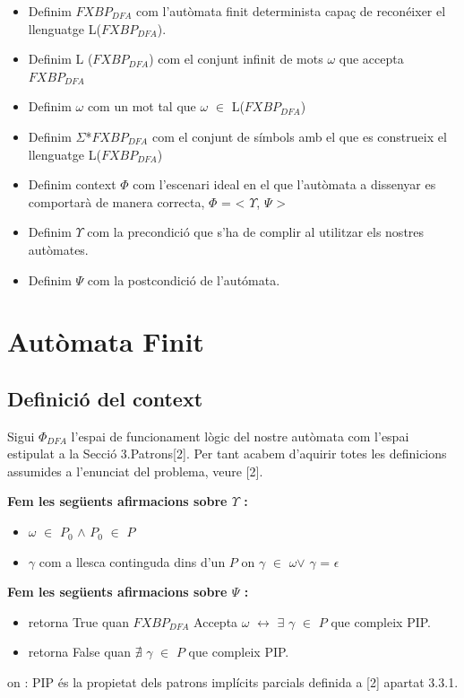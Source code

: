 \documentclass[12pt,a4paper]{report}
\def \w{$\omega$}
\def \dfa{$FXBP_{DFA} $}
\def \alphabetDFA{$\Sigma$*\dfa}
\def \context{$\Phi$}
\def \contextDFA{$\Phi_{DFA}$}
\def \pre{$\Upsilon$}
\def \post{$\Psi$}
\def \llesca{$\gamma$}
\begin{document}
\begin{itemize}
\item Definim \dfa{} com l’autòmata finit determinista capaç de reconéixer el llenguatge L(\dfa{}).
\item Definim L (\dfa{}) com el conjunt infinit de mots \w{} que accepta \dfa{}
\item Definim \w{} com un mot tal que \w{} $\in$ L(\dfa{})
\item Definim \alphabetDFA{} com el conjunt de símbols amb el que es construeix el llenguatge L(\dfa{})
\item Definim context \context{} com l’escenari ideal en el que l’autòmata a dissenyar es comportarà de manera correcta, \context{} = < \pre{}, \post{} >  
\item Definim \pre{} com la precondició que s'ha de complir al utilitzar els nostres autòmates. 
\item Definim \post{} com la postcondició de l'autómata.
\end{itemize}

\chapter{Autòmata Finit}

\section{Definició del context}

Sigui \contextDFA{} l'espai de funcionament lògic del nostre autòmata com l'espai estipulat a la Secció 3.Patrons[2]. Per tant acabem d'aquirir totes les definicions assumides a l'enunciat del problema, veure [2].

\textbf{Fem les següents afirmacions sobre \pre{} :}
\begin{itemize}
\item \w{} $\in$ $P_0$ $\wedge$ $P_0$ $\in$ $P$
\item \llesca{} com a llesca continguda dins d'un $P$ on \llesca{} $\in$ \w $\vee$ \llesca{} = $\epsilon$
\end{itemize}

\textbf{Fem les següents afirmacions sobre \post{} :}
\begin{itemize}
\item retorna True quan \dfa{} Accepta \w{} $\leftrightarrow$ $\exists$ \llesca{} $\in$ $P$ que compleix PIP.
\item retorna False quan $\nexists$ \llesca{} $\in$ $P$ que compleix PIP. 
\end{itemize}
on : PIP és la propietat dels patrons implícits parcials definida a [2] apartat 3.3.1. 
\end{document}
